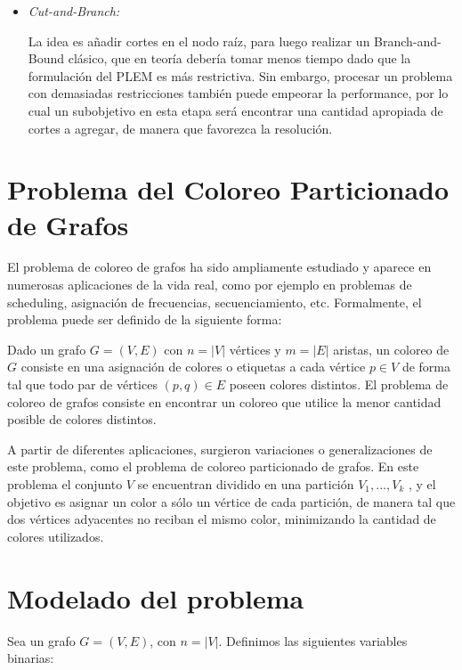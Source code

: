 \documentclass[a4paper]{article}
\begin{document}
\begin{itemize}
\begin{itemize}
		\item {\it Cut-and-Branch:}
		
		La idea es añadir cortes en el nodo raíz, para luego realizar un Branch-and-Bound clásico, que en teoría debería tomar menos tiempo dado que la formulación del PLEM es más restrictiva. Sin embargo, procesar un problema con demasiadas restricciones también puede empeorar la performance, por lo cual un subobjetivo en esta etapa será encontrar una cantidad apropiada de cortes a agregar, de manera que favorezca la resolución.
	
	\end{itemize}
	
	
\end{itemize}

\newpage

\section{Problema del Coloreo Particionado de Grafos}

El problema de coloreo de grafos ha sido ampliamente estudiado y aparece en numerosas aplicaciones de la vida real, como por ejemplo en problemas de scheduling, asignación de frecuencias, secuenciamiento, etc. Formalmente, el problema puede ser definido de la siguiente forma: 

Dado un grafo $G = (V,E)$ con $n = |V|$ vértices y $m = |E|$ aristas, un coloreo de $G$ consiste en una asignación de colores o etiquetas a cada vértice $p\in V$ de forma tal que todo par de vértices $(p, q) \in E$ poseen colores distintos. El problema de coloreo de grafos consiste en encontrar un coloreo que utilice la menor cantidad posible de colores distintos.

A partir de diferentes aplicaciones, surgieron variaciones o generalizaciones de este problema, como el problema de coloreo particionado de grafos. En este problema el conjunto $V$ se encuentran dividido en una partición $V_1 , . . . , V_k$ , y el objetivo es asignar un color a sólo un vértice de cada partición, de manera tal que dos vértices adyacentes no reciban el mismo color, minimizando la cantidad de colores utilizados.

\newpage

\section{Modelado del problema}

Sea un grafo $G = (V,E)$, con $n = |V|$.  Definimos las siguientes variables binarias:
\end{document}
